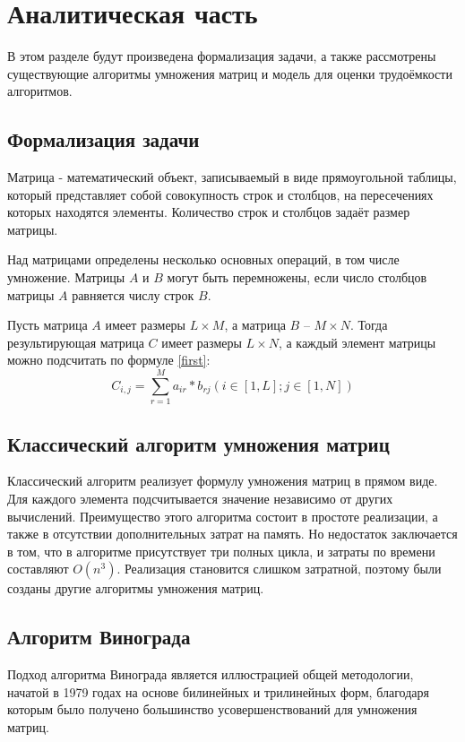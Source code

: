 \chapter{Аналитическая часть}
В этом разделе будут произведена формализация задачи, а также 
рассмотрены существующие алгоритмы умножения матриц и модель для
оценки трудоёмкости алгоритмов.

\section{Формализация задачи}
Матрица - математический объект, записываемый в виде прямоугольной таблицы, который представляет
собой совокупность строк и столбцов, на пересечениях которых находятся элементы. Количество строк
и столбцов задаёт размер матрицы.

Над матрицами определены несколько основных операций, в том числе умножение. Матрицы $A$ и $B$ 
могут быть перемножены, если число столбцов матрицы $A$ равняется числу строк $B$.

Пусть матрица $A$ имеет размеры $L \times M$, а матрица $B$ -- $M \times N$. Тогда результирующая матрица
$C$ имеет размеры $L\times N$, а каждый элемент матрицы можно подсчитать по формуле \ref{first}:
\begin{equation}
	\label{first}
	C_{i, j} = \sum\limits_{r=1}^M a_{ir} * b_{rj}   (i\in[1, L]; j\in[1, N])
\end{equation}

\section{Классический алгоритм умножения матриц}
Классический алгоритм реализует формулу умножения матриц в прямом виде. Для каждого элемента
подсчитывается значение независимо от других вычислений. Преимущество этого алгоритма состоит 
в простоте реализации, а также в отсутствии дополнительных затрат на память. Но недостаток заключается
в том, что в алгоритме присутствует три полных цикла, и затраты по времени составляют $O(n^3)$. 
Реализация становится слишком затратной, поэтому были созданы другие алгоритмы умножения матриц.

\section{Алгоритм Винограда}
Подход алгоритма Винограда является иллюстрацией общей методологии, начатой в 1979 годах на основе билинейных и трилинейных форм, 
благодаря которым было получено большинство усовершенствований для умножения матриц.

